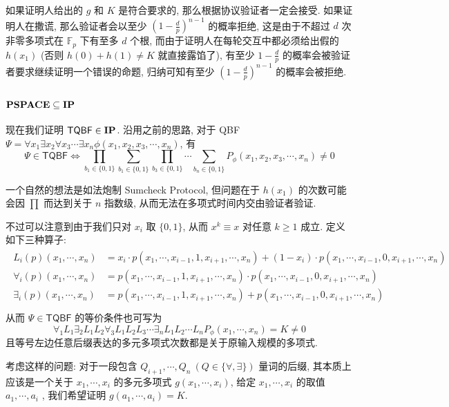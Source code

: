 \documentclass[8pt]{article}
\theoremstyle{compact}
\def\ge{\geqslant}
\def\PSPACE{\textbf{PSPACE}}
\begin{document}
如果证明人给出的 $g$ 和 $K$ 是符合要求的, 那么根据协议验证者一定会接受. 如果证明人在撒谎, 那么验证者会以至少 $\left(1 - \frac dp \right)^{n-1}$ 的概率拒绝, 这是由于不超过 $d$ 次非零多项式在 $\mathbb F_p$ 下有至多 $d$ 个根, 而由于证明人在每轮交互中都必须给出假的 $h(x_1)$ (否则 $h(0) + h(1) \neq K$ 就直接露馅了), 有至少 $1 - \frac dp$ 的概率会被验证者要求继续证明一个错误的命题, 归纳可知有至少 $\left(1 - \frac dp \right)^{n-1}$ 的概率会被拒绝.

\subsubsection{$\PSPACE \subseteq \IP$}
现在我们证明 $\textsf{TQBF} \in \textbf{IP}$. 沿用之前的思路, 对于 QBF $\Psi = \forall x_1\exists x_2\forall x_3 \cdots \exists x_n \phi(x_1, x_2, x_3, \cdots, x_n)$, 有 $$\Psi \in \textsf{TQBF} \Leftrightarrow \prod_{b_1 \in \{0, 1\}} \sum_{b_1 \in \{0, 1\}} \prod_{b_3 \in \{0, 1\}} \cdots \sum_{b_n \in \{0, 1\}} P_{\phi}(x_1, x_2, x_3, \cdots, x_n) \neq 0$$

一个自然的想法是如法炮制 Sumcheck Protocol, 但问题在于 $h(x_1)$ 的次数可能会因 $\prod$ 而达到关于 $n$ 指数级, 从而无法在多项式时间内交由验证者验证.

不过可以注意到由于我们只对 $x_i$ 取 $\{0, 1\}$, 从而 $x^k \equiv x$ 对任意 $k \ge 1$ 成立. 定义如下三种算子: \begin{align*}
	\begin{split}
		L_i(p)(x_1, \cdots, x_n) &= x_i \cdot p(x_1, \cdots, x_{i-1}, 1, x_{i+1}, \cdots, x_n) +(1 - x_i) \cdot p(x_1, \cdots, x_{i-1}, 0, x_{i+1}, \cdots, x_n) \\
		\forall_i(p)(x_1, \cdots, x_n) &= p(x_1, \cdots, x_{i-1}, 1, x_{i+1}, \cdots, x_n) \cdot p(x_1, \cdots, x_{i-1}, 0, x_{i+1}, \cdots, x_n) \\
		\exists_i(p)(x_1, \cdots, x_n) &= p(x_1, \cdots, x_{i-1}, 1, x_{i+1}, \cdots, x_n) + p(x_1, \cdots, x_{i-1}, 0, x_{i+1}, \cdots, x_n) \\
	\end{split}
\end{align*}
从而 $\Psi \in \textsf{TQBF}$ 的等价条件也可写为 $$\forall_1L_1\exists_2L_1L_2\forall_3L_1L_2L_3\cdots \exists_n L_1L_2\cdots L_n P_{\phi}(x_1, \cdots, x_n) = K \neq 0$$
且等号左边任意后缀表达的多元多项式次数都是关于原输入规模的多项式.

考虑这样的问题: 对于一段包含 $Q_{i+1}, \cdots, Q_n \ (Q \in \{\forall, \exists\})$ 量词的后缀, 其本质上应该是一个关于 $x_1, \cdots, x_i$ 的多元多项式 $g(x_1, \cdots, x_i)$, 给定 $x_1, \cdots, x_i$ 的取值 $a_1, \cdots, a_i$ , 我们希望证明 $g(a_1, \cdots, a_i) = K$.
\end{document}
